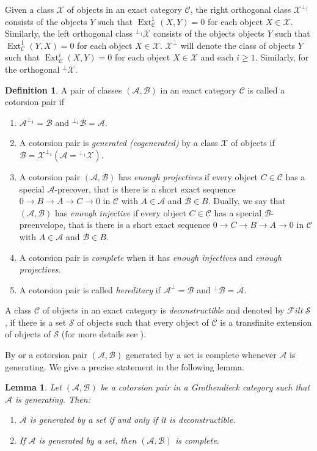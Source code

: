\documentclass[11pt,a4paper,reqno]{amsart}
\newcommand{\Ext}{\operatorname{Ext}}
\newcommand{\A}{\mathcal{A}}
\newcommand{\B}{\mathcal{B}}
\newcommand{\C}{\mathcal{C}}
\newcommand{\F}{\mathcal{F}}
\newcommand{\clS}{\mathcal{S}}
\newcommand{\X}{\mathcal{X}}
\theoremstyle{plain}
\newtheorem{lem}[thm]{Lemma}
\theoremstyle{definition}
\newtheorem{defn}[thm]{Definition}
\theoremstyle{remark}
\begin{document}
Given a class $\X$ of objects in an exact category $\C$, the right orthogonal class $\X^{\perp_1}$ consists of the objects $Y$ such that $\Ext^1_{\C}(X,Y)=0$ for each object $X\in \X$. Similarly, the left orthogonal class $^{\perp_1}\X $ consists of the objects objects $Y$ such that $\Ext^1_{\C}(Y,X)=0$ for each object $X\in \X$.
$\X^\perp$ will denote the class of objects $Y$ such that $\Ext^i_{\C}(X,Y)=0$ for each object $X\in \X$ and each $i\geq 1$. Similarly, for the orthogonal $^\perp\X $.
%
\begin{defn}\label{D:cotorsion-pair} A pair of classes $(\A, \B)$ in an exact category $\C$ is called a cotorsion pair if
\begin{enumerate}
\item $\A^{\perp_1}=\B$ and $^{\perp_1} \B=\A$.
\item A cotorsion pair is \emph{generated (cogenerated)} by a class $\X$ of objects if $\B=\X^{\perp_1} (\A={^{\perp_1}\X})$.
\item A cotorsion pair $(\A, \B)$ has \emph{enough projectives} if every object $C\in \C$ has a special $\A$-precover, that is there is a short exact sequence $0\to B\to A\to C\to 0$ in $\C$ with $A\in \A$ and $\B\in B$. Dually, we say that  $(\A, \B)$ has \emph{enough injective} if every object $C\in \C$ has a special $\B$-preenvelope, that is there is a short exact sequence $0\to C\to B\to A\to 0$ in $\C$ with $A\in \A$ and $\B\in B$.
\item A cotorsion pair is \emph{complete} when it has \emph{enough injectives} and \emph{enough projectives}.
\item A cotorsion pair is called \emph{hereditary} if $\A^\perp=\B$ and $^{\perp} \B=\A$.
\end{enumerate}
\end{defn}
A class $\C$ of objects in an exact category is \emph{deconstructible} and denoted by $\F ilt\ \clS$, if there is a set $\clS$ of objects such that every object of $\C$ is a transfinite extension of objects of $\clS$ (for more details see \cite[Definition 3.7 and 3.10]{Sto13}).

By \cite{ET01} or \cite{Q} a cotorsion pair $(\A,\B)$ generated by a set is complete whenever $\A$ is generating. We give a precise statement in the following lemma.

\begin{lem}\label{lem1_2} Let $(\A,\B)$ be a cotorsion pair in a Grothendieck category such that $\A$ is generating. Then:
  \begin{enumerate}
    \item $\A$ is generated by a set if and only if it is deconstructible.
    \item If $\A$ is generated by a set, then $(\A,\B)$ is complete.
  \end{enumerate}
\end{lem}
\end{document}
